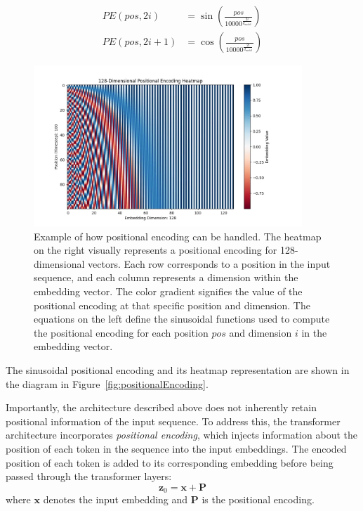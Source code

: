 \documentclass{pracalicmgr}
\begin{document}
\begin{figure}[H]
    \centering
    \begin{minipage}{0.49\textwidth}
        \centering
        \begin{align*}
        PE(pos, 2i) &= \sin\left(\frac{pos}{10000^{\frac{2i}{d_{\text{model}}}}}\right) \\
        PE(pos, 2i + 1) &= \cos\left(\frac{pos}{10000^{\frac{2i}{d_{\text{model}}}}}\right)
        \end{align*}
    \end{minipage}
    \begin{minipage}{0.49\textwidth}
        \centering
        \includegraphics[width=0.9\textwidth]{src/embedings.png}
    \end{minipage}
    \caption{Example of how positional encoding can be handled. The heatmap on the right visually represents a positional encoding for 128-dimensional vectors. Each row corresponds to a position in the input sequence, and each column represents a dimension within the embedding vector. The color gradient signifies the value of the positional encoding at that specific position and dimension. The equations on the left define the sinusoidal functions used to compute the positional encoding for each position \( pos \) and dimension \( i \) in the embedding vector.}
\end{figure}

The sinusoidal positional encoding and its heatmap representation are shown in the diagram in Figure~\ref{fig:positionalEncoding}.


Importantly, the architecture described above does not inherently retain positional information of the input sequence. To address this, the transformer architecture incorporates \textit{positional encoding}, which injects information about the position of each token in the sequence into the input embeddings. The encoded position of each token is added to its corresponding embedding before being passed through the transformer layers:
\[
\mathbf{z}_0 = \mathbf{x} + \mathbf{P}
\]
where \( \mathbf{x} \) denotes the input embedding and \( \mathbf{P} \) is the positional encoding.
\end{document}
